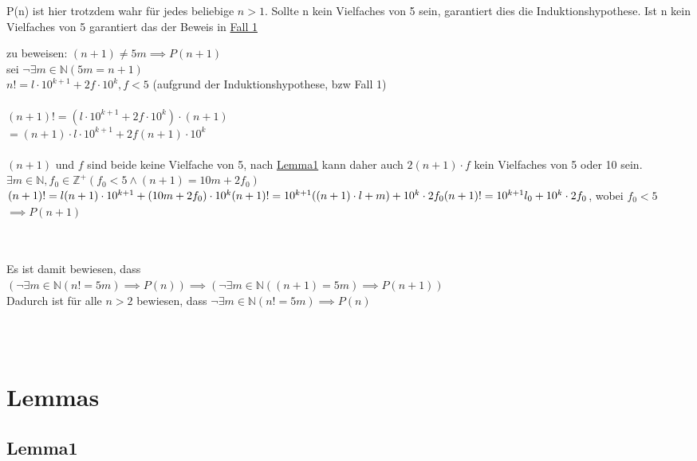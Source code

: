 \documentclass[12pt, letterpaper]{article}
\begin{document}
P(n) ist hier trotzdem wahr für jedes beliebige $n>1$.
Sollte n kein Vielfaches von 5 sein, garantiert dies die Induktionshypothese. Ist n kein Vielfaches von 5 garantiert das der Beweis in \hyperref[sec:Fall 1]{Fall 1}

zu beweisen: $(n+1)\neq 5m \implies P(n+1)$\\

sei $\neg \exists m \in \mathbb{N}(5m =n+1)$\\

$n! = l\cdot 10^{k+1}+2f\cdot 10^{k}, f<5$ (aufgrund der Induktionshypothese, bzw Fall 1)\\\\
$(n+1)! = (l\cdot 10^{k+1}+2f\cdot 10^{k})\cdot (n+1)$\\
$= (n+1)\cdot l\cdot 10^{k+1}+2f(n+1)\cdot 10^{k}$\\\\
$(n+1)$ und $f$ sind beide keine Vielfache von 5, nach \hyperref[sec:Lemma1]{Lemma1} kann daher auch $2(n+1)\cdot f$ kein Vielfaches von 5 oder 10 sein.\\
$\exists m\in\mathbb{N}, f_{0}\in\mathbb{Z}^{+}(f_{0}<5\land (n+1) = 10m + 2f_{0})
$\\
$(n+1)! = l(n+1)\cdot 10^{k+1}+(10m+2f_{0})\cdot 10^{k}\\
(n+1)!=10^{k+1}((n+1)\cdot l+m)+10^{k}\cdot 2f_{0}\\
(n+1)!=10^{k+1}l_{0}+10^{k}\cdot 2f_{0}$, wobei $f_{0} < 5$
\\
$\implies P(n+1)$






\\\\







Es ist damit bewiesen, dass\\ $(\neg \exists m\in \mathbb{N}(n! = 5m) \implies P(n)) \implies(\neg \exists m\in\mathbb{N}((n+1) = 5m) \implies P(n+1))$\\

Dadurch ist für alle $n>2$ bewiesen, dass $\neg \exists m\in\mathbb{N}(n! = 5m)\implies P(n)$ 



\\\\




\newpage
\section{Lemmas}
\label{sec:Lemmas}

\subsection{Lemma1}
\label{sec:Lemma1}
\end{document}
